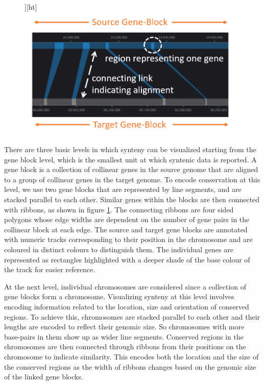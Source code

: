 \begin{figure}][ht]
  \centering
  \includegraphics[width=.50\linewidth]{images/ch_4_link_plot.PNG}
  \label{fig:ch_4_link_plot}
\end{figure}


There are three basic levels in which synteny can be visualized starting from the gene block level, which is the smallest unit at which syntenic data is reported. A gene block is a collection of collinear genes in the source genome that are aligned to a group of collinear genes in the target genome. To encode conservation at this level, we use two gene blocks that are represented by line segments, and are stacked parallel to each other. Similar genes within the blocks are then connected with ribbons, as shown in figure \ref{fig:ch_4_link_plot}. The connecting ribbons are four sided polygons whose edge widths are dependent on the number of gene pairs in the collinear block at each edge. The source and target gene blocks are annotated with numeric tracks corresponding to their position in the chromosome and are coloured in distinct colours to distinguish them. The individual genes are represented as rectangles highlighted with a deeper shade of the base colour of the track for easier reference. 

At the next level, individual chromosomes are considered since a collection of gene blocks form a chromosome. Visualizing synteny at this level involves encoding information related to the location, size and orientation of conserved regions. To achieve this, chromosomes are stacked parallel to each other and their lengths are encoded to reflect their genomic size. So chromosomes with more base-pairs in them show up as wider line segments. Conserved regions in the chromosomes are then connected through ribbons from their positions on the chromosome to indicate similarity. This encodes both the location and the size of the conserved regions as the width of ribbons changes based on the genomic size of the linked gene blocks.


